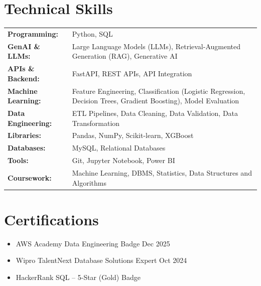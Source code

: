 \documentclass[a4paper,12pt]{article}
\begin{document}
\section{Technical Skills}
\begin{tabularx}{\linewidth}{@{}l X@{}}
\textbf{Programming:} & \normalsize{Python, SQL}\\
\textbf{GenAI \& LLMs:} & \normalsize{Large Language Models (LLMs), Retrieval-Augmented Generation (RAG), Generative AI}\\
\textbf{APIs \& Backend:} & \normalsize{FastAPI, REST APIs, API Integration}\\
\textbf{Machine Learning:} & \normalsize{Feature Engineering, Classification (Logistic Regression, Decision Trees, Gradient Boosting), Model Evaluation}\\
\textbf{Data Engineering:} & \normalsize{ETL Pipelines, Data Cleaning, Data Validation, Data Transformation}\\
\textbf{Libraries:} & \normalsize{Pandas, NumPy, Scikit-learn, XGBoost}\\
\textbf{Databases:} & \normalsize{MySQL, Relational Databases}\\
\textbf{Tools:} & \normalsize{Git, Jupyter Notebook, Power BI}\\
\textbf{Coursework:} & \normalsize{Machine Learning, DBMS, Statistics, Data Structures and Algorithms}\\

\end{tabularx}


\section{Certifications}

\begin{itemize}[leftmargin=1em, itemsep=10pt, label=--]
    \item AWS Academy Data Engineering Badge \hfill Dec 2025
    \item Wipro TalentNext Database Solutions Expert \hfill Oct 2024
    \item HackerRank SQL -- 5-Star (Gold) Badge
\end{itemize}


\vfill
\center
\end{document}
